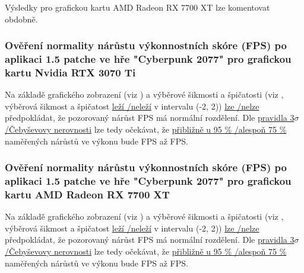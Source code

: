 \vspace{1em}
\noindent
Výsledky pro grafickou kartu AMD Radeon RX 7700 XT lze komentovat obdobně.

\subsubsection*{Ověření normality nárůstu výkonnostních skóre (FPS) po aplikaci 1.5 patche ve hře "Cyberpunk 2077" pro grafickou kartu Nvidia RTX 3070 Ti}

Na základě grafického zobrazení (viz \TODO) a výběrové šikmosti a špičatosti (viz , výběrová šikmost a špičatost \ul{leží \slash neleží} 
v intervalu (-2, 2)) \ul{lze \slash nelze} předpokládat, že pozorovaný nárůst FPS má normální rozdělení. Dle \ul{pravidla 3$\sigma$ \slash Čebyševovy nerovnosti} 
lze tedy očekávat, že \ul{přibližně u 95 \% \slash alespoň 75 \%} naměřených nárůstů ve výkonu bude  FPS až  FPS\@.

\subsubsection*{Ověření normality nárůstu výkonnostních skóre (FPS) po aplikaci 1.5 patche ve hře "Cyberpunk 2077" pro grafickou kartu AMD Radeon RX 7700 XT}

Na základě grafického zobrazení (viz \TODO) a výběrové šikmosti a špičatosti (viz , výběrová šikmost a špičatost \ul{leží \slash neleží} 
v intervalu (-2, 2)) \ul{lze \slash nelze} předpokládat, že pozorovaný nárůst FPS má normální rozdělení. Dle \ul{pravidla 3$\sigma$ \slash Čebyševovy nerovnosti} 
lze tedy očekávat, že \ul{přibližně u 95 \% \slash alespoň 75 \%} naměřených nárůstů ve výkonu bude  FPS až  FPS\@.

\endinput
